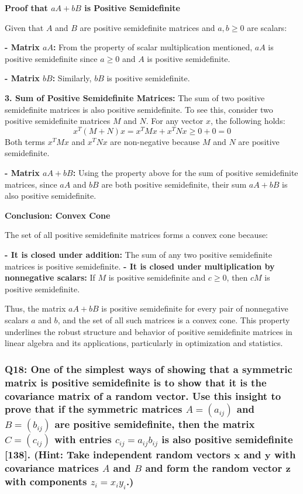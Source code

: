 \documentclass[8pt]{article}
\begin{document}
\textbf{Proof that \(aA + bB\) is Positive Semidefinite}

Given that \(A\) and \(B\) are positive semidefinite matrices and \(a, b \geq 0\) are scalars:

\textbf{- Matrix \(aA\):} From the property of scalar multiplication mentioned, \(aA\) is positive semidefinite since \(a \geq 0\) and \(A\) is positive semidefinite.

\textbf{- Matrix \(bB\):} Similarly, \(bB\) is positive semidefinite.

\textbf{3. Sum of Positive Semidefinite Matrices:}
   The sum of two positive semidefinite matrices is also positive semidefinite. To see this, consider two positive semidefinite matrices \(M\) and \(N\). For any vector \(x\), the following holds:
   \[
   x^T (M + N) x = x^T M x + x^T N x \geq 0 + 0 = 0
   \]
   Both terms \(x^T M x\) and \(x^T N x\) are non-negative because \(M\) and \(N\) are positive semidefinite.

\textbf{- Matrix \(aA + bB\): }Using the property above for the sum of positive semidefinite matrices, since \(aA\) and \(bB\) are both positive semidefinite, their sum \(aA + bB\) is also positive semidefinite.

\textbf{Conclusion: Convex Cone}

The set of all positive semidefinite matrices forms a convex cone because:

\textbf{- It is closed under addition:} The sum of any two positive semidefinite matrices is positive semidefinite.
\textbf{- It is closed under multiplication by nonnegative scalars: }If \(M\) is positive semidefinite and \(c \geq 0\), then \(cM\) is positive semidefinite.

Thus, the matrix \(aA + bB\) is positive semidefinite for every pair of nonnegative scalars \(a\) and \(b\), and the set of all such matrices is a convex cone. This property underlines the robust structure and behavior of positive semidefinite matrices in linear algebra and its applications, particularly in optimization and statistics.

\subsubsection*{Q18: One of the simplest ways of showing that a symmetric matrix is positive semidefinite is to show that it is the covariance matrix of a random vector. Use this insight to prove that if the symmetric matrices \(A = (a_{ij})\) and \(B = (b_{ij})\) are positive semidefinite, then the matrix \(C = (c_{ij})\) with entries \(c_{ij} = a_{ij} b_{ij}\) is also positive semidefinite [138]. (Hint: Take independent random vectors \(\mathbf{x}\) and \(\mathbf{y}\) with covariance matrices \(A\) and \(B\) and form the random vector \(\mathbf{z}\) with components \(z_i = x_i y_i\).)}
\end{document}
